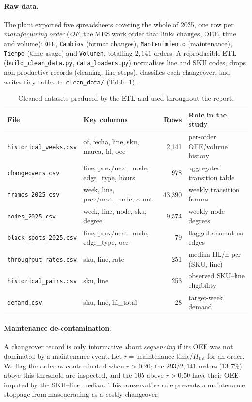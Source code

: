\documentclass[11pt,a4paper]{article}
\begin{document}
\paragraph{Raw data.}
The plant exported five spreadsheets covering the whole of 2025, one row per
\emph{manufacturing order} (\emph{OF}, the MES work order that links changes,
OEE, time and volume): \texttt{OEE}, \texttt{Cambios} (format changes),
\texttt{Mantenimiento} (maintenance), \texttt{Tiempo} (time usage) and
\texttt{Volumen}, totalling $2{,}141$ orders. A reproducible ETL
(\texttt{build\_clean\_data.py}, \texttt{data\_loaders.py}) normalises line and
SKU codes, drops non-productive records (cleaning, line stops), classifies each
changeover, and writes tidy tables to \texttt{clean\_data/}
(Table~\ref{tab:datasets}).

\begin{table}[H]\centering\small\setlength{\tabcolsep}{4.5pt}
\begin{tabular}{@{}llrl@{}}
\toprule
File & Key columns & Rows & Role in the study \\
\midrule
\texttt{historical\_weeks.csv} & of, fecha, line, sku, marca, hl, oee & 2{,}141 & per-order OEE/volume history \\
\texttt{changeovers.csv}       & line, prev/next\_node, edge\_type, hours & 978 & aggregated transition table \\
\texttt{frames\_2025.csv}      & week, line, prev/next\_node, count & 43{,}390 & weekly transition frames \\
\texttt{nodes\_2025.csv}       & week, line, node, sku, degree & 9{,}574 & weekly node degrees \\
\texttt{black\_spots\_2025.csv}& line, prev/next\_node, edge\_type, oee & 79 & flagged anomalous edges \\
\texttt{throughput\_rates.csv} & sku, line, rate & 251 & median HL/h per (SKU, line) \\
\texttt{historical\_pairs.csv} & sku, line & 253 & observed SKU--line eligibility \\
\texttt{demand.csv}            & sku, line, hl\_total & 28 & target-week demand \\
\bottomrule
\end{tabular}
\caption{Cleaned datasets produced by the ETL and used throughout the report.}
\label{tab:datasets}
\end{table}

\paragraph{Maintenance de-contamination.}
A changeover record is only informative about \emph{sequencing} if its OEE was
not dominated by a maintenance event. Let $r=\,$maintenance time$/H_{\text{tot}}$
for an order. We flag the order as contaminated when $r>0.20$; the $293/2{,}141$
orders ($13.7\%$) above this threshold are inspected, and the $105$ above
$r>0.50$ have their OEE imputed by the SKU--line median. This conservative rule
prevents a maintenance stoppage from masquerading as a costly changeover.
\end{document}
